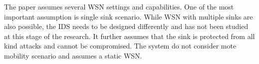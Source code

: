 \documentclass[conference,final]{IEEEtran}
\begin{document}


The paper assumes several WSN settings and capabilities.
One of the most important assumption is single  sink scenario. While WSN with multiple sinks are also possible, the IDS needs to be designed differently and has not been studied at this stage of the research. 
It further assumes that the sink is protected from all kind attacks and cannot be compromised. 
The system do not consider mote mobility scenario and assumes a static WSN.


\end{document}
